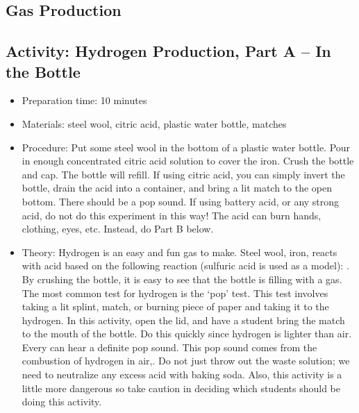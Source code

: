 \begin{itemize}
{\begin{itemize}
\begin{itemize}
{\section{Gas Production}

\subsection{Activity: Hydrogen Production, Part A – In the Bottle}
\begin{itemize}
\item{Preparation time: 10 minutes}
\item{Materials: steel wool, citric acid, plastic water bottle, matches}
\item{Procedure: Put some steel wool in the bottom of a plastic water bottle. Pour in enough concentrated citric acid solution to cover the iron. Crush the bottle and cap. The bottle will refill. If using citric acid, you can simply invert the bottle, drain the acid into a container, and bring a lit match to the open bottom. There should be a pop sound. If using battery acid, or any strong acid, do not do this experiment in this way! The acid can burn hands, clothing, eyes, etc. Instead, do Part B below.}
\item{Theory: Hydrogen is an easy and fun gas to make. Steel wool, iron, reacts with acid based on the following reaction (sulfuric acid is used as a model): . By crushing the bottle, it is easy to see that the bottle is filling with a gas. The most common test for hydrogen is the ‘pop’ test. This test involves taking a lit splint, match, or burning piece of paper and taking it to the hydrogen. In this activity, open the lid, and have a student bring the match to the mouth of the bottle. Do this quickly since hydrogen is lighter than air. Every can hear a definite pop sound. This pop sound comes from the combustion of hydrogen in air,. Do not just throw out the waste solution; we need to neutralize any excess acid with baking soda. Also, this activity is a little more dangerous so take caution in deciding which students should be doing this activity.}
\end{itemize}

}
\end{itemize}
\end{itemize}}
\end{itemize}
